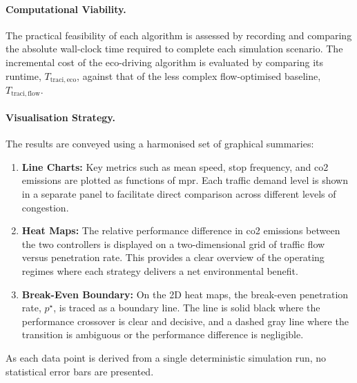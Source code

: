 \paragraph{Computational Viability.}
The practical feasibility of each algorithm is assessed by recording and comparing the absolute wall-clock time required to complete each simulation scenario. The incremental cost of the eco-driving algorithm is evaluated by comparing its runtime, $T_{\mathrm{traci,eco}}$, against that of the less complex flow-optimised baseline, $T_{\mathrm{traci,flow}}$.

\paragraph{Visualisation Strategy.}
The results are conveyed using a harmonised set of graphical summaries:
\begin{enumerate}[label=\textbf{(\alph*)},leftmargin=*]
    \item \textbf{Line Charts:} Key metrics such as mean speed, stop frequency, and \ac{co2} emissions are plotted as functions of \ac{mpr}. Each traffic demand level is shown in a separate panel to facilitate direct comparison across different levels of congestion.
    \item \textbf{Heat Maps:} The relative performance difference in \ac{co2} emissions between the two controllers is displayed on a two-dimensional grid of traffic flow versus penetration rate. This provides a clear overview of the operating regimes where each strategy delivers a net environmental benefit.
    \item \textbf{Break-Even Boundary:} On the 2D heat maps, the break-even penetration rate, $p^{\star}$, is traced as a boundary line. The line is solid black where the performance crossover is clear and decisive, and a dashed gray line where the transition is ambiguous or the performance difference is negligible.
\end{enumerate}
As each data point is derived from a single deterministic simulation run, no statistical error bars are presented.

